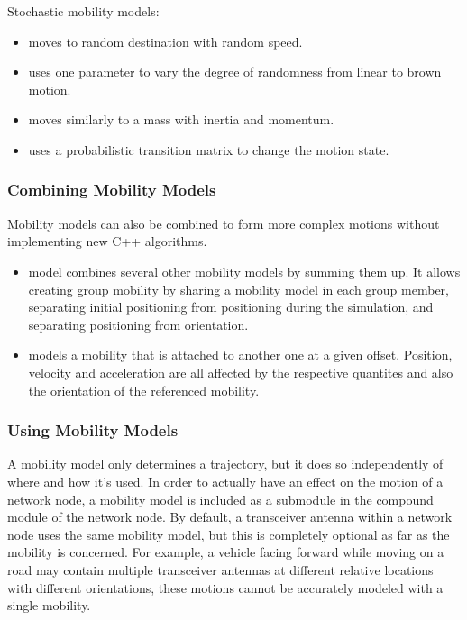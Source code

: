 Stochastic mobility models:

\begin{itemize}
        \item {} moves to random destination with random speed.
        \item {} uses one parameter to vary the degree of randomness from linear to brown motion.
        \item {} moves similarly to a mass with inertia and momentum.
        \item {} uses a probabilistic transition matrix to change the motion state.
\end{itemize}

\subsubsection*{Combining Mobility Models}
Mobility models can also be combined to form more complex motions without implementing new C++ algorithms.

\begin{itemize}
        \item {} model combines several other mobility models by summing them up. It allows creating group mobility by sharing a mobility model in each group member, separating initial positioning from positioning during the simulation, and separating positioning from orientation.
        \item {} models a mobility that is attached to another one at a given offset. Position, velocity and acceleration are all affected by the respective quantites and also the orientation of the referenced mobility.
\end{itemize}

\subsubsection*{Using Mobility Models}
A mobility model only determines a trajectory, but it does so independently of where and how it's used. In order to actually have an effect on the motion of a network node, a mobility model is included as a submodule in the compound module of the network node. By default, a transceiver antenna within a network node uses the same mobility model, but this is completely optional as far as the mobility is concerned. For example, a vehicle facing forward while moving on a road may contain multiple transceiver antennas at different relative locations with different orientations, these motions cannot be accurately modeled with a single mobility.


